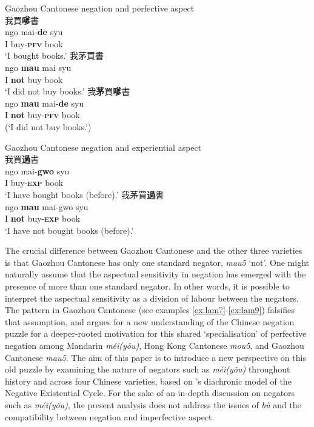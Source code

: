 \documentclass[output=paper]{langscibook}
\begin{document}
\ea Gaozhou Cantonese negation and perfective aspect \label{ex:lam8}\\
  \ea 我買\textbf{嗲}書 \label{ex:lam8a}\\
  	\gll ngo mai-\textbf{de} syu\\
  	I buy-\textbf{\textsc{pfv}} book\\
 	 \glt `I bought books.'	
  \ex 我茅買書 \label{ex:lam8b}\\
  	\gll ngo \textbf{mau} mai syu\\
  	I \textbf{not} buy book\\
  	\glt `I did not buy books.'
  \ex 我\textbf{茅}買\textbf{嗲}書 \label{ex:lam8c}\\
	\gll *ngo \textbf{mau} mai-\textbf{de} syu\\
	I \textbf{not} buy-\textbf{\textsc{pfv}} book\\
	\glt (`I did not buy books.')
\z \z 


\ea Gaozhou Cantonese negation and experiential aspect \label{ex:lam9}\\
  \ea 我買\textbf{過}書 \label{ex:lam9a}\\
  	\gll ngo mai-\textbf{gwo} syu \\
  	I buy-\textbf{\textsc{exp}} book\\
  	\glt `I have bought books (before).'
  \ex 我茅買\textbf{過}書 \label{ex:lam9b}\\
  	\gll ngo	 \textbf{mau} mai-gwo syu \\
  	I \textbf{not} buy-\textbf{\textsc{exp}} book\\
  	\glt `I have not bought books (before).'
\z \z 


The crucial difference between Gaozhou Cantonese and the other three varieties is that Gaozhou Cantonese has only one standard negator, \textit{mau5} `not'. One might naturally assume that the aspectual sensitivity in negation has emerged with the presence of more than one standard negator. In other words, it is possible to interpret the aspectual sensitivity as a division of labour between the negators. The pattern in Gaozhou Cantonese (see examples \ref{ex:lam7}-\ref{ex:lam9}) falsifies that assumption, and argues for a new understanding of the Chinese negation puzzle for a deeper-rooted motivation for this shared `specialisation' of perfective negation among Mandarin \textit{méi(yǒu)}, Hong Kong Cantonese \textit{mou5}, and Gaozhou Cantonese \textit{mau5}. The aim of this paper is to introduce a new perspective on this old puzzle by examining the nature of negators such as \textit{méi(yǒu)} throughout history and across four Chinese varieties, based on \citeauthor{Croft1991}'s diachronic model of the Negative Existential Cycle. For the sake of an in-depth discussion on negators such as \textit{méi(yǒu)}, the present analysis does not address the issues of \textit{bù} and the compatibility between negation and imperfective aspect.
\end{document}
